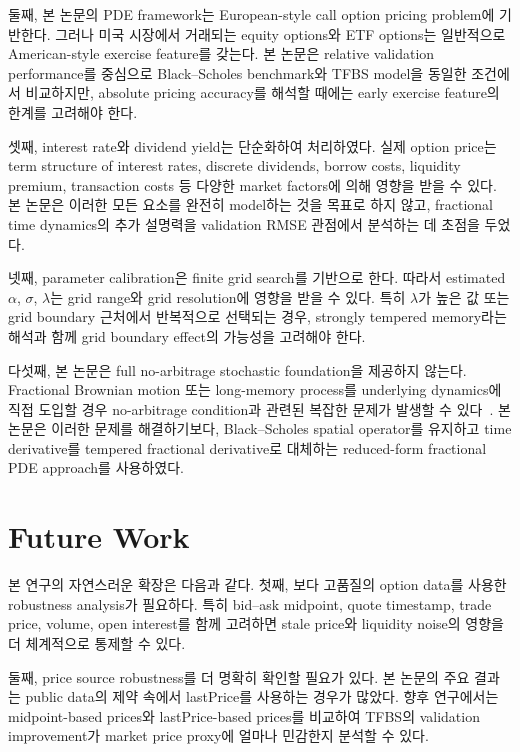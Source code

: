\documentclass[11pt,a4paper]{report}
\begin{document}
둘째, 본 논문의 PDE framework는 European-style call option pricing problem에 기반한다. 그러나 미국 시장에서 거래되는 equity options와 ETF options는 일반적으로 American-style exercise feature를 갖는다. 본 논문은 relative validation performance를 중심으로 Black--Scholes benchmark와 TFBS model을 동일한 조건에서 비교하지만, absolute pricing accuracy를 해석할 때에는 early exercise feature의 한계를 고려해야 한다.

셋째, interest rate와 dividend yield는 단순화하여 처리하였다. 실제 option price는 term structure of interest rates, discrete dividends, borrow costs, liquidity premium, transaction costs 등 다양한 market factors에 의해 영향을 받을 수 있다. 본 논문은 이러한 모든 요소를 완전히 model하는 것을 목표로 하지 않고, fractional time dynamics의 추가 설명력을 validation RMSE 관점에서 분석하는 데 초점을 두었다.

넷째, parameter calibration은 finite grid search를 기반으로 한다. 따라서 estimated \(\alpha\), \(\sigma\), \(\lambda\)는 grid range와 grid resolution에 영향을 받을 수 있다. 특히 \(\lambda\)가 높은 값 또는 grid boundary 근처에서 반복적으로 선택되는 경우, strongly tempered memory라는 해석과 함께 grid boundary effect의 가능성을 고려해야 한다.

다섯째, 본 논문은 full no-arbitrage stochastic foundation을 제공하지 않는다. Fractional Brownian motion 또는 long-memory process를 underlying dynamics에 직접 도입할 경우 no-arbitrage condition과 관련된 복잡한 문제가 발생할 수 있다~\cite{Cheridito2003}. 본 논문은 이러한 문제를 해결하기보다, Black--Scholes spatial operator를 유지하고 time derivative를 tempered fractional derivative로 대체하는 reduced-form fractional PDE approach를 사용하였다.

\section{Future Work}

본 연구의 자연스러운 확장은 다음과 같다. 첫째, 보다 고품질의 option data를 사용한 robustness analysis가 필요하다. 특히 bid--ask midpoint, quote timestamp, trade price, volume, open interest를 함께 고려하면 stale price와 liquidity noise의 영향을 더 체계적으로 통제할 수 있다.

둘째, price source robustness를 더 명확히 확인할 필요가 있다. 본 논문의 주요 결과는 public data의 제약 속에서 lastPrice를 사용하는 경우가 많았다. 향후 연구에서는 midpoint-based prices와 lastPrice-based prices를 비교하여 TFBS의 validation improvement가 market price proxy에 얼마나 민감한지 분석할 수 있다.
\end{document}
